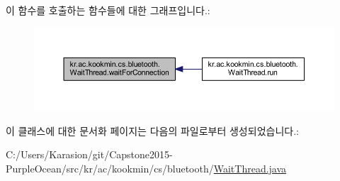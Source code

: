 이 함수를 호출하는 함수들에 대한 그래프입니다.\+:\nopagebreak
\begin{figure}[H]
\begin{center}
\leavevmode
\includegraphics[width=350pt]{classkr_1_1ac_1_1kookmin_1_1cs_1_1bluetooth_1_1_wait_thread_a67b7f1b5d2691ea47589b2c32363a3bd_icgraph}
\end{center}
\end{figure}




이 클래스에 대한 문서화 페이지는 다음의 파일로부터 생성되었습니다.\+:\begin{DoxyCompactItemize}
\item 
C\+:/\+Users/\+Karasion/git/\+Capstone2015-\/\+Purple\+Ocean/src/kr/ac/kookmin/cs/bluetooth/\hyperlink{_wait_thread_8java}{Wait\+Thread.\+java}\end{DoxyCompactItemize}
